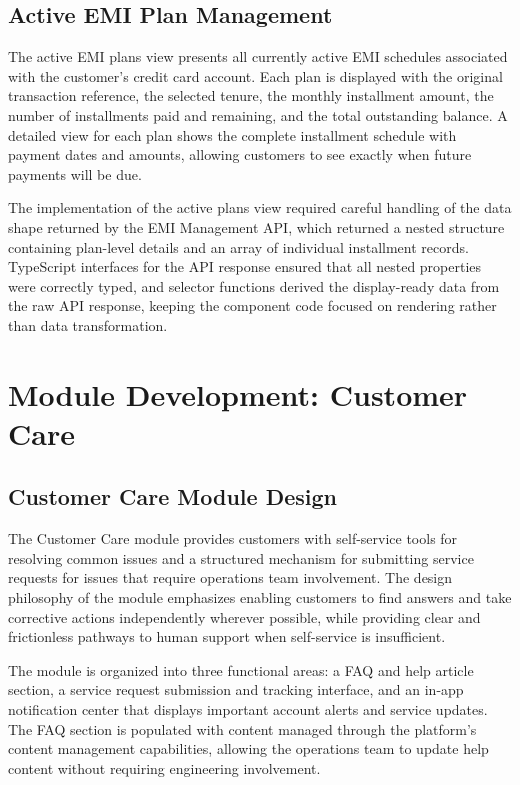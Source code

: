 \subsection{Active EMI Plan Management}

The active EMI plans view presents all currently active EMI schedules associated with the customer's credit card account. Each plan is displayed with the original transaction reference, the selected tenure, the monthly installment amount, the number of installments paid and remaining, and the total outstanding balance. A detailed view for each plan shows the complete installment schedule with payment dates and amounts, allowing customers to see exactly when future payments will be due.

The implementation of the active plans view required careful handling of the data shape returned by the EMI Management API, which returned a nested structure containing plan-level details and an array of individual installment records. TypeScript interfaces for the API response ensured that all nested properties were correctly typed, and selector functions derived the display-ready data from the raw API response, keeping the component code focused on rendering rather than data transformation.

\section{Module Development: Customer Care}

\subsection{Customer Care Module Design}

The Customer Care module provides customers with self-service tools for resolving common issues and a structured mechanism for submitting service requests for issues that require operations team involvement. The design philosophy of the module emphasizes enabling customers to find answers and take corrective actions independently wherever possible, while providing clear and frictionless pathways to human support when self-service is insufficient.

The module is organized into three functional areas: a FAQ and help article section, a service request submission and tracking interface, and an in-app notification center that displays important account alerts and service updates. The FAQ section is populated with content managed through the platform's content management capabilities, allowing the operations team to update help content without requiring engineering involvement.

